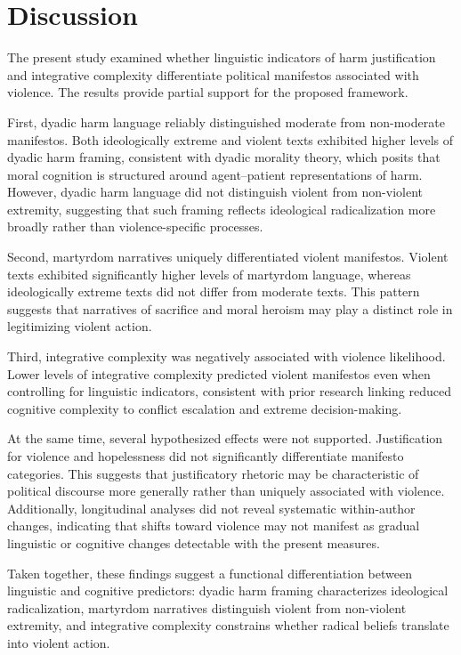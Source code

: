 \documentclass[
  english,
  man,floatsintext]{apa6}
\begin{document}
\section{Discussion}\label{discussion}

The present study examined whether linguistic indicators of harm justification and integrative complexity differentiate political manifestos associated with violence. The results provide partial support for the proposed framework.

First, dyadic harm language reliably distinguished moderate from non-moderate manifestos. Both ideologically extreme and violent texts exhibited higher levels of dyadic harm framing, consistent with dyadic morality theory, which posits that moral cognition is structured around agent--patient representations of harm. However, dyadic harm language did not distinguish violent from non-violent extremity, suggesting that such framing reflects ideological radicalization more broadly rather than violence-specific processes.

Second, martyrdom narratives uniquely differentiated violent manifestos. Violent texts exhibited significantly higher levels of martyrdom language, whereas ideologically extreme texts did not differ from moderate texts. This pattern suggests that narratives of sacrifice and moral heroism may play a distinct role in legitimizing violent action.

Third, integrative complexity was negatively associated with violence likelihood. Lower levels of integrative complexity predicted violent manifestos even when controlling for linguistic indicators, consistent with prior research linking reduced cognitive complexity to conflict escalation and extreme decision-making.

At the same time, several hypothesized effects were not supported. Justification for violence and hopelessness did not significantly differentiate manifesto categories. This suggests that justificatory rhetoric may be characteristic of political discourse more generally rather than uniquely associated with violence. Additionally, longitudinal analyses did not reveal systematic within-author changes, indicating that shifts toward violence may not manifest as gradual linguistic or cognitive changes detectable with the present measures.

Taken together, these findings suggest a functional differentiation between linguistic and cognitive predictors: dyadic harm framing characterizes ideological radicalization, martyrdom narratives distinguish violent from non-violent extremity, and integrative complexity constrains whether radical beliefs translate into violent action.
\end{document}
